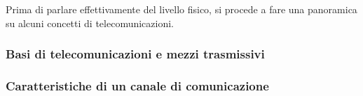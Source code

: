 \documentclass{subfiles}
\begin{document}
Prima di parlare effettivamente del livello fisico, si procede a fare una panoramica su alcuni concetti di telecomunicazioni.

\subsubsection{Basi di telecomunicazioni e mezzi trasmissivi}


\subsubsection{Caratteristiche di un canale di comunicazione}

\end{document}
